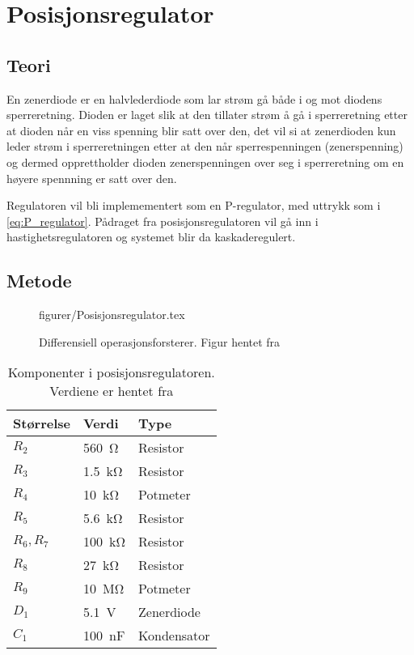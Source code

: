 \section{Posisjonsregulator}\label{sec:posisjonsregulator}

\subsection{Teori}




En zenerdiode er en halvlederdiode som lar strøm gå både i og mot diodens sperreretning. Dioden er laget slik at den tillater strøm å gå i sperreretning etter at dioden når en viss spenning blir satt over den, det vil si at zenerdioden kun leder strøm i sperreretningen etter at den når sperrespenningen (zenerspenning) og dermed opprettholder dioden zenerspenningen over seg i sperreretning om en høyere spennning er satt over den.

Regulatoren vil bli implemementert som en P-regulator, med uttrykk som i \eqref{eq:P_regulator}. Pådraget fra posisjonsregulatoren vil gå inn i hastighetsregulatoren og systemet blir da kaskaderegulert.

\subsection{Metode}

\begin{figure} [h]
    \centering
     {figurer/Posisjonsregulator.tex}
    \caption{Differensiell operasjonsforsterer. Figur hentet fra \cite{AnalogMotorlabbOppgaver}}
    \label{fig:Posisjonsregulator}
\end{figure}

\begin{table}[h]
    \centering
    \caption{Komponenter i posisjonsregulatoren. Verdiene er hentet fra \cite{AnalogMotorlabbOppgaver}}
    \begin{tabular}{lll}
        \toprule
		Størrelse & Verdi & Type \\
		\midrule
        $R_2$ & \SI{560}{\ohm} & Resistor \\
        $R_3$ & \SI{1.5}{\kilo\ohm} & Resistor\\
        $R_4$ & \SI{10}{\kilo\ohm} & Potmeter\\
        $R_5$ & \SI{5.6}{\kilo\ohm} & Resistor\\
        $R_6, R_7$ & \SI{100}{\kilo\ohm} & Resistor\\
        $R_8$ & \SI{27}{\kilo\ohm} & Resistor\\
        $R_9$ & \SI{10}{\mega\ohm} & Potmeter\\
        $D_1$ & \SI{5.1}{\volt} & Zenerdiode\\
        $C_1$ & \SI{100}{\nano\farad} & Kondensator\\
		\bottomrule
    \end{tabular}
    \label{tab:my_label}
\end{table}

